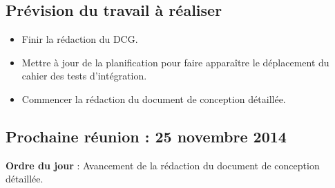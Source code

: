 \documentclass[12pt,a4paper]{article}
\begin{document}
\subsection*{Prévision du travail à réaliser}

\begin{itemize}[label = $\ast$]

\item Finir la rédaction du DCG.
\item Mettre à jour de la planification pour faire apparaître le déplacement du cahier des tests d'intégration.
\item Commencer la rédaction du document de conception détaillée.
\end{itemize}

\subsection*{Prochaine réunion : 25 novembre 2014}

\textbf{Ordre du jour} : Avancement de la rédaction du document de conception détaillée.\\
\end{document}
